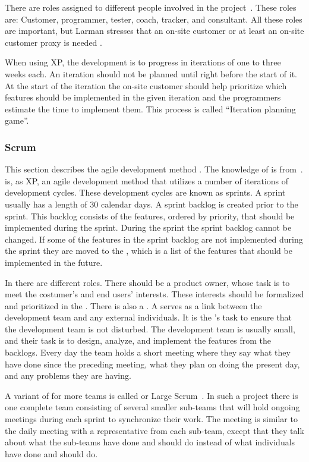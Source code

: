 There are roles assigned to different people involved in the project~\cite[p.~145]{Larman04}.
These roles are: Customer, programmer, tester, coach, tracker, and consultant.
All these roles are important, but Larman stresses that an on-site customer or at least an on-site customer proxy is needed \cite[p.~152-156]{Larman04}.

When using XP, the development is to progress in iterations of one to three weeks each.
An iteration should not be planned until right before the start of it.
At the start of the iteration the on-site customer should help prioritize which features should be implemented in the given iteration and the programmers estimate the time to implement them.
This process is called ``Iteration planning game''.

\subsubsection{Scrum}
\label{par:scrum}
This section describes the agile development method \scrum{}. The knowledge of \scrum{} is from~\cite[chap.~7,pp.~109-136]{Larman04}.
\Scrum{} is, as XP, an agile development method that utilizes a number of iterations of development cycles.
These development cycles are known as sprints.
A sprint usually has a length of 30 calendar days.
A sprint backlog is created prior to the sprint. 
This backlog consists of the features, ordered by priority, that should be implemented during the sprint.
During the sprint the sprint backlog cannot be changed.
If some of the features in the sprint backlog are not implemented during the sprint they are moved to the \productbacklog{}, which is a list of the features that should be implemented in the future.

In \scrum{} there are different roles. 
There should be a product owner, whose task is to meet the costumer's and end users' interests. 
These interests should be formalized and prioritized in the \productbacklog{}.
There is also a \scrummaster{}. 
A \scrummaster{} serves as a link between the development team and any external individuals.
It is the \scrummaster{}'s task to ensure that the development team is not disturbed.
The development team is usually small, and their task is to design, analyze, and implement the features from the backlogs.
Every day the \scrum{} team holds a short meeting where they say what they have done since the preceding meeting, what they plan on doing the present day, and any problems they are having.

A variant of \scrum{} for more teams is called \sos{} or Large Scrum~\cite[pp.~23-30]{scrumchecklist}\cite[p.~111]{Larman04}.
In such a project there is one complete team consisting of several smaller sub-teams that will hold ongoing \sos{} meetings during each sprint to synchronize their work.
The \sos{} meeting is similar to the daily \scrum{} meeting with a representative from each sub-team, except that they talk about what the sub-teams have done and should do instead of what individuals have done and should do.

